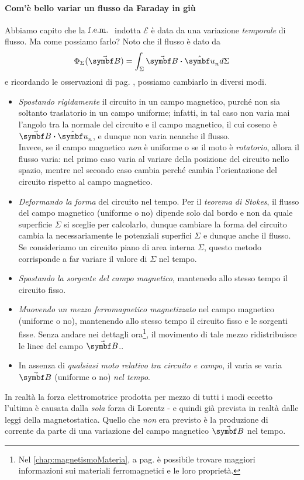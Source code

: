 \paragraph{Com'è bello variar un flusso da Faraday in giù}
Abbiamo capito che la $\mathrm{f.e.m.}\ $ indotta $\mathcal{E}$ è data da una variazione \textit{temporale} di flusso. Ma come possiamo farlo? Noto che il flusso è dato da
\begin{equation*}
	\Phi_\Sigma(\vba B)=\int_\Sigma \vba B\vdot \vbh{u}_n d\Sigma	
\end{equation*}
e ricordando le osservazioni di pag. \pageref{osservazioniFaraday}, possiamo cambiarlo in diversi modi.
\begin{itemize}
	\item \textit{Spostando rigidamente} il circuito in un campo magnetico, purché non sia soltanto traslatorio in un campo uniforme; infatti, in tal caso non varia mai l'angolo tra la normale del circuito e il campo magnetico, il cui coseno è $\vba{B}\vdot \vbh{u}_n$, e dunque non varia neanche il flusso.\\
	Invece, se il campo magnetico \textit{non} è uniforme o se il moto è \textit{rotatorio}, allora il flusso varia: nel primo caso varia al variare della posizione del circuito nello spazio, mentre nel secondo caso cambia perché cambia l'orientazione del circuito rispetto al campo magnetico.
	\item \textit{Deformando la forma} del circuito nel tempo. Per il \textit{teorema di Stokes}, il flusso del campo magnetico (uniforme o no) dipende solo dal bordo e non da quale superficie $\Sigma$ si sceglie per calcolarlo, dunque cambiare la forma del circuito cambia la necessariamente le potenziali superfici $\Sigma$ e dunque anche il flusso. Se consideriamo un circuito piano di area interna $\Sigma$, questo metodo corrisponde a far variare il valore di $\Sigma$ nel tempo.
	\item \textit{Spostando la sorgente del campo magnetico}, mantenedo allo stesso tempo il circuito fisso.
	\item \textit{Muovendo un mezzo ferromagnetico magnetizzato} nel campo magnetico (uniforme o no), mantenendo allo stesso tempo il circuito fisso e le sorgenti fisse. Senza andare nei dettagli ora\footnote{Nel \autoref{chap:magnetismoMateria}, a pag. \pageref{ferromagnetici} è possibile trovare maggiori informazioni sui materiali ferromagnetici e le loro proprietà.}, il movimento di tale mezzo ridistribuisce le linee del campo $\vba{B}$..
	\item In assenza di \textit{qualsiasi moto relativo tra circuito e campo}, il varia se varia $\vba B$ (uniforme o no) \textit{nel tempo}. 
\end{itemize}
In realtà la forza elettromotrice prodotta per mezzo di tutti i modi eccetto l'ultima è causata dalla \textit{sola} forza di Lorentz - e quindi già prevista in realtà dalle leggi della magnetostatica. Quello che \textit{non} era previsto è la produzione di corrente da parte di una variazione del campo magnetico $\vba B$ nel tempo.\label{faradayavevaascopertoiltempo}
